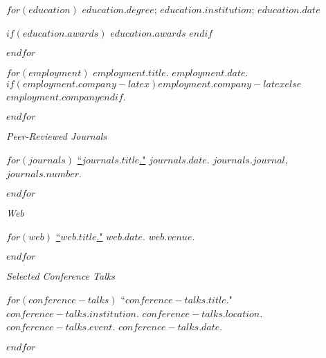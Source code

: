 \documentclass[11pt,article,oneside]{memoir}
\begin{document}
\medskip

\reversemarginpar

\bigskip


$for(education)$
\ind $education.degree$; $education.institution$; $education.date$

$if(education.awards)$
\ind \hspace{0.35in} \footnotesize $education.awards$ \normalsize \vspace{0.05in}
$endif$

\smallskip
$endfor$

\bigskip


$for(employment)$
\ind $employment.title$. $employment.date$. $if(employment.company-latex)$$employment.company-latex$$else$$employment.company$$endif$.

\smallskip
$endfor$

\bigskip
\pagebreak[1]


\ind \emph{Peer-Reviewed Journals}

\smallskip

$for(journals)$
\ind \href{$journals.url$}{``$journals.title$."} $journals.date$. \emph{$journals.journal$}, $journals.number$.

\smallskip
$endfor$
\medskip

\ind \emph{Web}

\smallskip

$for(web)$
\ind \href{$web.url$}{``$web.title$."} $web.date$. \emph{$web.venue$}. 

\smallskip
$endfor$

\bigskip
\pagebreak[1]


\ind \emph{Selected Conference Talks}

\smallskip

$for(conference-talks)$
\ind ``$conference-talks.title$." $conference-talks.institution$. $conference-talks.location$. \emph{$conference-talks.event$}. $conference-talks.date$. \normalsize

\smallskip
$endfor$
\medskip
\end{document}

